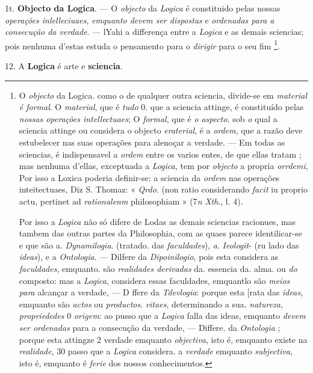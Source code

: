 1t. \textbf{Objecto da Logica}. --- O \emph{objecto} da \emph{Logica} é constituido pelas nossas \emph{operações inlelleciuaes}, \emph{emquanto devem ser dispostas} e \emph{ordenadas para a consecução da verdade}. --- lYahi a differença entre a \emph{Logica} e as demais sciencias; pois nenhuma d'estas estuda o pensamento para o \emph{dirigir} para o seu fim \footnote{O \emph{objecto} da Logica. como o de qualquer outra sciencia, divide-se em \emph{material é formal}. O \emph{material}, que é \emph{tudo} 0. que a sciencia attinge, é constituído pelas \emph{nossas operações intellectuaes}; O \emph{formal}, que é \emph{o aspecto}. sob \emph{o} qual a sciencia attinge ou considera o objecto \emph{eraterial}, é a \emph{ordem}, que a razão deve estubelecer nas suas operações para alenoçar a verdade. --- Em todas as sciencias, é indispensavel a \emph{ordem} entre os varios entes, de que ellas tratam ; mas nenhuma d'ellas, exceptuada a \emph{Logica}, tem por \emph{objecto} a propria \emph{orrdemi}, Por isso a Loxica poderia definir-se: a sciencia da \emph{ordem} nas operações inteitectuaes, Diz S. Thomaz: « \emph{Qrdo}. (non ratio considerando \emph{facit} iu proprio actu, pertinet ad \emph{rationalenm} philosophiam » (7\emph{n} \textbar{} \emph{Xth}., l. 4).\par Por isso a \emph{Logica} não só difere de Lodas as demais sciencias racionues, mas tambem das outras partes da Philosophia, com as quaes parece identilicar-se e que são a. \emph{Dynamilogia}. (tratado. das \emph{faculdades}), \emph{a}. \emph{Ieologit}- (ru lado das \emph{ideas}), e a \emph{Ontologia}. --- Dilfere da \emph{Dipoinilogio}, pois esta considera as \emph{faculdades}, emquanto. são \emph{realidades derivadas} da. essencia da. alma. ou \emph{do} composto: mas a \emph{Logica}, considera essas faculdades, emquantlo são \emph{meios para} alcançar a verdade, --- D ffere da \emph{Tdevlogia}: porque esta [rata das \emph{ideas}, emquanto são \emph{actos} ou \emph{productos}. \emph{vitaes}, determinando a sua. \emph{natureza}, \emph{propriededes} 0 \emph{origem}: ao pusso que a \emph{Logica} falla das ideas, emquanto \emph{devem ser ordenadas} para a consecução da verdade, --- Differe. da \emph{Ontologia} ; porque esta attingze 2 verdade emquanto \emph{objectiva}, isto é, emquanto existe na \emph{realidade}, 30 passo que a \emph{Logica} considera. a \emph{verdade} emquanto \emph{subjectiva}, isto é, emquanto é \emph{ferie} dos nossos conhecimentos.}.

12. A \textbf{Logica} é arte e \textbf{sciencia}. \textbar{}

